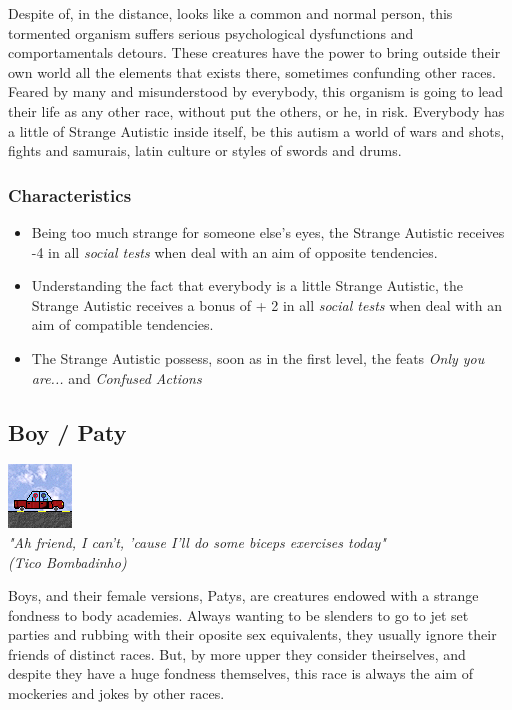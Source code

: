 \documentclass[ letterpaper,12pt]{article}
\begin{document}
Despite of, in the distance, looks like a common and normal person, this
tormented organism suffers serious psychological dysfunctions and
comportamentals detours. These creatures have the power to bring outside their
own world all the elements that exists there, sometimes confunding other races.
Feared by many and misunderstood by everybody, this organism is going to lead
their life as any other race, without put the others, or he, in risk.
Everybody has a little of Strange Autistic inside itself, be this autism a
world of wars and shots, fights and samurais, latin culture or styles of swords
and drums.

\subsubsection{Characteristics}
\begin{itemize}
\item{Being too much strange for someone else's eyes, the Strange Autistic receives -4 in all {\it social tests} when deal with an aim of opposite tendencies.}
\item{Understanding the fact that everybody is a little Strange Autistic, the Strange Autistic receives a bonus of + 2 in all {\it social tests} when deal with an aim of compatible tendencies.}
\item{The Strange Autistic possess, soon as in the first level, the feats {\it Only you are...} and {\it Confused Actions}}
\end{itemize}

\subsection{Boy / Paty}
\includegraphics{../data/races/Img/boy.png}\\
{\it "Ah friend, I can't, 'cause I'll do some biceps exercises today"\\
(Tico Bombadinho)\\}

Boys, and their female versions, Patys, are creatures endowed with a strange
fondness to body academies. Always wanting to be slenders to go to jet set
parties and rubbing with their oposite sex equivalents, they usually ignore
their friends of distinct races. But, by more upper they consider theirselves,
and despite they have a huge fondness themselves, this race is always the aim
of mockeries and jokes by other races.\\
\end{document}
